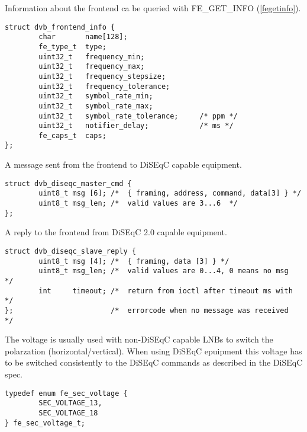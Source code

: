 \label{frontendinfo}

Information about the frontend ca be queried with
FE\_GET\_INFO (\ref{fegetinfo}).

\begin{verbatim}
struct dvb_frontend_info {
        char       name[128];
        fe_type_t  type;
        uint32_t   frequency_min;
        uint32_t   frequency_max;
        uint32_t   frequency_stepsize;
        uint32_t   frequency_tolerance;
        uint32_t   symbol_rate_min;
        uint32_t   symbol_rate_max;
        uint32_t   symbol_rate_tolerance;     /* ppm */
        uint32_t   notifier_delay;            /* ms */
        fe_caps_t  caps;
};
\end{verbatim}

\label{diseqcmastercmd}

A message sent from the frontend to DiSEqC capable equipment.

\begin{verbatim}
struct dvb_diseqc_master_cmd {
        uint8_t msg [6]; /*  { framing, address, command, data[3] } */
        uint8_t msg_len; /*  valid values are 3...6  */
};
\end{verbatim}

\label{diseqcslavereply}

A reply to the frontend from DiSEqC 2.0 capable equipment.

\begin{verbatim}
struct dvb_diseqc_slave_reply {
        uint8_t msg [4]; /*  { framing, data [3] } */
        uint8_t msg_len; /*  valid values are 0...4, 0 means no msg  */
        int     timeout; /*  return from ioctl after timeout ms with */
};                       /*  errorcode when no message was received  */
\end{verbatim}

\label{secvoltage}

The voltage is usually used with non-DiSEqC capable LNBs to
switch the polarzation (horizontal/vertical). 
When using DiSEqC epuipment this voltage has to be switched consistently 
to the DiSEqC commands as described in the DiSEqC spec.

\begin{verbatim}
typedef enum fe_sec_voltage {
        SEC_VOLTAGE_13,
        SEC_VOLTAGE_18
} fe_sec_voltage_t;
\end{verbatim}

